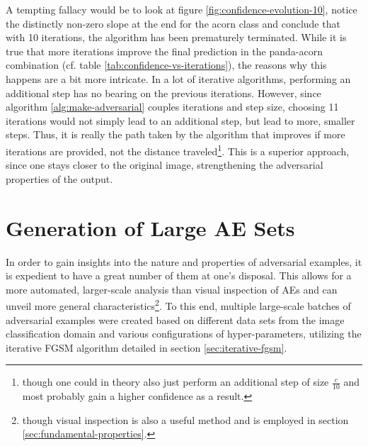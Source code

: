 \documentclass[11pt, a4paper]{article}
\begin{document}
A tempting fallacy would be to look at figure \ref{fig:confidence-evolution-10}, notice the distinctly non-zero slope at the end for the acorn class and conclude that with 10 iterations, the algorithm has been prematurely terminated. While it is true that more iterations improve the final prediction in the panda-acorn combination (cf. table \ref{tab:confidence-vs-iterations}), the reasons why this happens are a bit more intricate. In a lot of iterative algorithms, performing an additional step has no bearing on the previous iterations. However, since algorithm \ref{alg:make-adversarial} couples iterations and step size, choosing 11 iterations would not simply lead to an additional step, but lead to more, smaller steps. Thus, it is really the path taken by the algorithm that improves if more iterations are provided, not the distance traveled\footnote{though one could in theory also just perform an additional step of size $\frac{c}{10}$ and most probably gain a higher confidence as a result.}. This is a superior approach, since one stays closer to the original image, strengthening the adversarial properties of the output.









\section{Generation of Large AE Sets}
\label{sec:generation-large-sets}

In order to gain insights into the nature and properties of adversarial examples, it is expedient to have a great number of them at one's disposal. This allows for a more automated, larger-scale analysis than visual inspection of AEs and can unveil more general characteristics\footnote{though visual inspection is also a useful method and is employed in section \ref{sec:fundamental-properties}.}. To this end, multiple large-scale batches of adversarial examples were created based on different data sets from the image classification domain and various configurations of hyper-parameters, utilizing the iterative FGSM algorithm detailed in section \ref{sec:iterative-fgsm}. 
\end{document}
